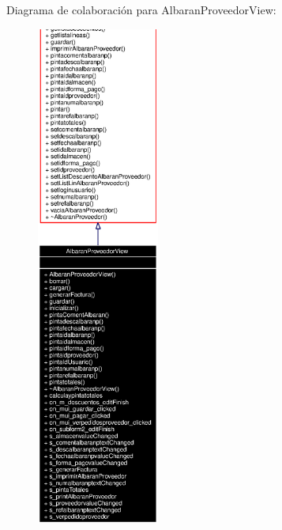 Diagrama de colaboraci\'{o}n para Albaran\-Proveedor\-View:\begin{figure}[H]
\begin{center}
\leavevmode
\includegraphics[width=114pt]{classAlbaranProveedorView__coll__graph}
\end{center}
\end{figure}
